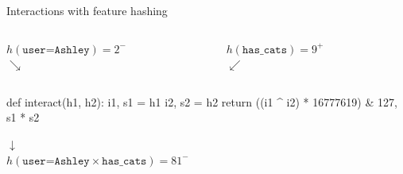 \documentclass[12pt,aspectratio=169]{beamer}
\begin{document}
\begin{frame}[fragile]{Interactions with feature hashing}
    \centering
    \begin{columns}
        \begin{column}{0.5\textwidth}
            \centering
            $h \left( \texttt{user=Ashley} \right) = 2^{-}$ \\
            \vspace{0.5em}
            $\searrow$
        \end{column}
        \begin{column}{0.5\textwidth}
            \centering
            $h \left( \texttt{has\_cats} \right) = 9^{+}$ \\
            \vspace{0.5em}
            $\swarrow$
        \end{column}
    \end{columns}
    \vspace{1em}
    \begin{py3}
        def interact(h1, h2):
            i1, s1 = h1
            i2, s2 = h2
            return ((i1 ^ i2) * 16777619) & 127, s1 * s2
    \end{py3}
    \vspace{0.5em}
    $\downarrow$ \\
    \vspace{0.5em}
    $h \left( \texttt{user=Ashley} \times \texttt{has\_cats} \right) = 81^{-}$
\end{frame}
\end{document}
